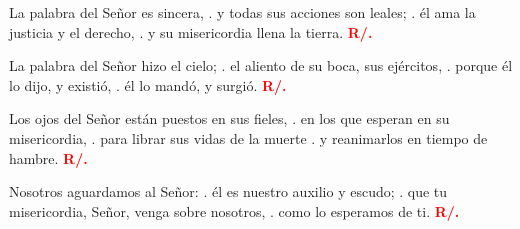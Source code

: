 \documentclass[12pt, letterpaper, spanish]{report}
\begin{document}
\hspace{2cm} La palabra del Se\~nor es sincera, \newline
. \hspace{2.5cm} y todas sus acciones son leales; \newline
. \hspace{2.5cm} \'el ama la justicia y el derecho, \newline
. \hspace{2.5cm} y su misericordia llena la tierra. \hspace{1cm} {\bfseries \textcolor{red}{R/.}} \newline

\hspace{2cm} La palabra del Se\~nor hizo el cielo; \newline
. \hspace{2.5cm} el aliento de su boca, sus ej\'ercitos, \newline
. \hspace{2.5cm} porque \'el lo dijo, y existi\'o, \newline
. \hspace{2.5cm} \'el lo mand\'o, y surgi\'o. \hspace{1cm} {\bfseries \textcolor{red}{R/.}} \newline

\hspace{2cm} Los ojos del Se\~nor est\'an puestos en sus fieles, \newline
. \hspace{2.5cm}  en los que esperan en su misericordia, \newline
. \hspace{2.5cm}  para librar sus vidas de la muerte \newline
. \hspace{2.5cm}  y reanimarlos en tiempo de hambre. \hspace{1cm} {\bfseries \textcolor{red}{R/.}} \newline

\hspace{2cm} Nosotros aguardamos al Se\~nor: \newline
. \hspace{2.5cm}  \'el es nuestro auxilio y escudo; \newline
. \hspace{2.5cm}  que tu misericordia, Se\~nor, venga sobre nosotros, \newline
. \hspace{2.5cm}  como lo esperamos de ti. \hspace{1cm} {\bfseries \textcolor{red}{R/.}} \newline
\end{document}
